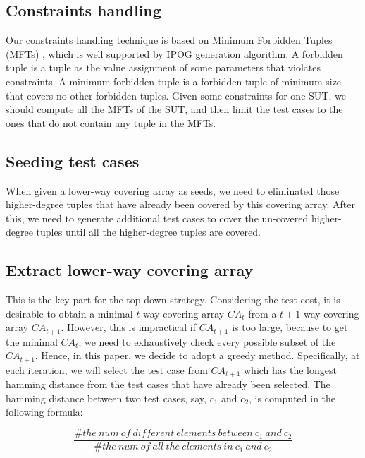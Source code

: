 \documentclass[conference]{IEEEtran}
\theoremstyle{definition}
\begin{document}
\subsection{Constraints handling}
Our constraints handling technique is based on Minimum Forbidden Tuples (MFTs) \cite{yu2014combinatorial,yu2015constraint}, which is well supported by IPOG generation algorithm. A forbidden tuple is a tuple as the value assignment of some parameters that violates constraints. A minimum forbidden tuple is a forbidden tuple of minimum size that covers no other forbidden tuples. Given some constraints for one SUT, we should compute all the MFTs of the SUT, and then limit the test cases to the ones that do not contain any tuple in the MFTs.

\subsection{Seeding test cases}
When given a lower-way covering array as seeds, we need to eliminated those higher-degree tuples that have already been covered by this covering array. After this, we need to generate additional test cases to cover the un-covered higher-degree tuples until all the higher-degree tuples are covered.


\subsection{Extract lower-way covering array}
This is the key part for the top-down strategy. Considering the test cost, it is desirable to obtain a minimal $t$-way covering array $CA_{t}$  from a $t+1$-way covering array $CA_{t+1}$. However, this is impractical if $CA_{t+1}$ is too large, because to get the minimal $CA_{t}$, we need to exhaustively check every possible subset of the $CA_{t+1}$. Hence, in this paper, we decide to adopt a greedy method. Specifically, at each iteration, we will select the test case from $CA_{t+1}$ which has the longest hamming distance from the test cases that have already been selected.  The hamming distance between two test cases, say, $c_{1}$ and $c_{2}$, is computed in the following formula:

$$ \frac{\#the\ num\ of\ different\ elements\ between\ c_{1}\ and\ c_{2}}{\#the\ num\ of\ all\ the\ elements\ in\ c_{1}\ and\ c_{2}} $$
\end{document}
